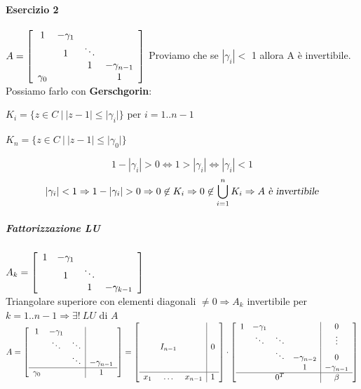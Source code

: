 \documentclass[10pt]{book}
\begin{document}
\paragraph{Esercizio 2} 
\begin{math}
A = \left[
\begin{array}{c c c c}
	1 & - \gamma_1 & & \\
	& 1 & \ddots & \\
	& & 1 & -\gamma_{n-1} \\
	\gamma_0 & & & 1\\
\end{array}
\right]
\end{math}
Proviamo che se $|\gamma_i| <$ 1 allora A è invertibile.\\Possiamo farlo con \textbf{Gerschgorin}:
\begin{list}{}{}
	\item $K_i = \{ z \in C\:|\: |z-1| \leq |\gamma_i|\}$ per $i = 1..n-1$
	\item $K_n = \{ z \in C\:|\: |z-1| \leq |\gamma_0|\}$
\end{list}
$$1 - |\gamma_i| > 0 \Leftrightarrow 1 > |\gamma_i| \Leftrightarrow |\gamma_i| < 1$$
$$|\gamma_i| < 1 \Rightarrow 1 - |\gamma_i| > 0 \Rightarrow 0 \not\in K_i \Rightarrow 0 \not\in \bigcup_{i=1}^n K_i \Rightarrow A\textsl{ è invertibile}$$
\subparagraph{Fattorizzazione LU} $A_k = \left[
\begin{array}{c c c c}
	1 & - \gamma_1 & & \\
	& 1 & \ddots & \\
	& & 1 & -\gamma_{k-1}
\end{array}
\right]$\\Triangolare superiore con elementi diagonali $\neq 0 \Rightarrow A_k$ invertibile per $k = 1..n-1 \Rightarrow \exists!\:LU$ di $A$\\
\begin{math}
A = \left[ \begin{array}{c c c | c}
	1 & -\gamma_1 & & \\
	& \ddots & \ddots & \\
	& &\ddots & -\gamma_{n-1}\\
	\hline
	\gamma_0 & & & 1
\end{array} \right] =
\left[ \begin{array}{c c c | c}
	& & & \\
	& & & \\
	& I_{n-1} & & 0 \\
	& & & \\
	& & & \\
	\hline
	x_1 & \ldots & x_{n-1} & 1
\end{array} \right] \cdot
\left[ \begin{array}{c c c c | c}
	1 & -\gamma_1 & & & 0\\
	& \ddots & \ddots & & \vdots\\
	& & \ddots & -\gamma_{n-2} & 0\\
	& & & 1 & -\gamma_{n-1}\\
	\hline
	& & 0^T & & \beta
\end{array} \right]
\end{math}\\
\end{document}

